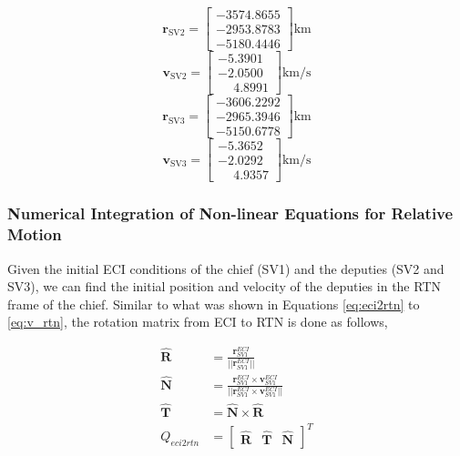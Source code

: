 \[
\mathbf{r}_{\text{SV2}} =
\begin{bmatrix}
-3574.8655 \\
-2953.8783 \\
-5180.4446
\end{bmatrix} \text{km}
\]
\[
\mathbf{v}_{\text{SV2}} =
\begin{bmatrix}
-5.3901 \\
-2.0500 \\
\phantom{-}4.8991
\end{bmatrix} \text{km/s}
\]
\[
\mathbf{r}_{\text{SV3}} =
\begin{bmatrix}
-3606.2292 \\
-2965.3946 \\
-5150.6778
\end{bmatrix} \text{km}
\]
\[
\mathbf{v}_{\text{SV3}} =
\begin{bmatrix}
-5.3652 \\
-2.0292 \\
\phantom{-}4.9357
\end{bmatrix} \text{km/s}
\]


\subsubsection{Numerical Integration of Non-linear Equations for Relative Motion} \label{sec:nonlinear_rel_eom}
Given the initial ECI conditions of the chief (SV1) and the deputies (SV2 and SV3), we can find the initial position and velocity of the deputies in the RTN frame of the chief. Similar to what was shown in Equations \ref{eq:eci2rtn} to \ref{eq:v_rtn}, the rotation matrix from ECI to RTN is done as follows, 

\begin{align}
    \boldsymbol{\hat{R}} &= \frac{\boldsymbol{r}^{ECI}_{SV1}}{||\boldsymbol{r}^{ECI}_{SV1}||} \\ \label{eq:q_eci2rtn_rel}
    \boldsymbol{\hat{N}} &= \frac{\boldsymbol{r}^{ECI}_{SV1} \times \boldsymbol{v}^{ECI}_{SV1}}{||\boldsymbol{r}^{ECI}_{SV1} \times \boldsymbol{v}^{ECI}_{SV1}||} \\
    \boldsymbol{\hat{T}} &= \boldsymbol{\hat{N}} \times \boldsymbol{\hat{R}} \\
    Q_{eci2rtn} &= \begin{bmatrix}
        \boldsymbol{\hat{R}} & \boldsymbol{\hat{T}} & \boldsymbol{\hat{N}}
    \end{bmatrix}^T \label{eq:eci2rtn}
\end{align}

